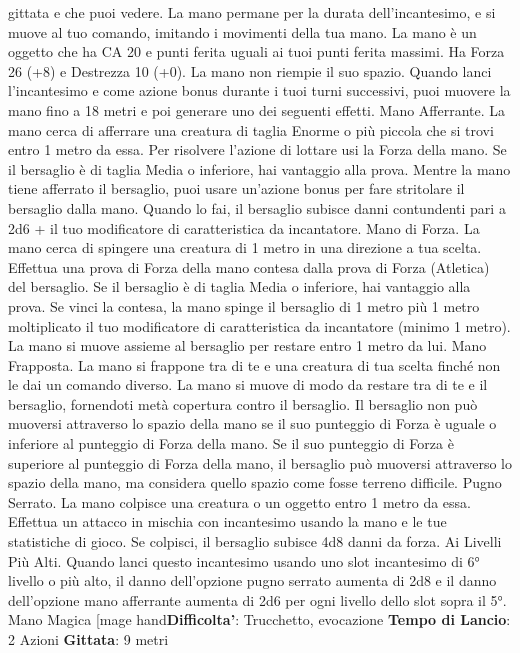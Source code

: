 \begin{multicols}{2}
gittata e che puoi vedere. La mano permane per la
durata dell’incantesimo, e si muove al tuo comando,
imitando i movimenti della tua mano.
La mano è un oggetto che ha CA 20 e punti ferita uguali
ai tuoi punti ferita massimi. Ha Forza 26 (+8) e
Destrezza 10 (+0). La mano non riempie il suo spazio.
Quando lanci l’incantesimo e come azione bonus
durante i tuoi turni successivi, puoi muovere la mano
fino a 18 metri e poi generare uno dei seguenti effetti.
Mano Afferrante. La mano cerca di afferrare una
creatura di taglia Enorme o più piccola che si trovi entro 
1 metro da essa. Per risolvere l’azione di lottare usi la
Forza della mano. Se il bersaglio è di taglia Media o
inferiore, hai vantaggio alla prova. Mentre la mano tiene
afferrato il bersaglio, puoi usare un’azione bonus per
fare stritolare il bersaglio dalla mano. Quando lo fai, il
bersaglio subisce danni contundenti pari a 2d6 + il tuo
modificatore di caratteristica da incantatore.
Mano di Forza. La mano cerca di spingere una
creatura di 1 metro in una direzione a tua scelta.
Effettua una prova di Forza della mano contesa dalla
prova di Forza (Atletica) del bersaglio. Se il bersaglio è
di taglia Media o inferiore, hai vantaggio alla prova. Se
vinci la contesa, la mano spinge il bersaglio di 1 metro
più 1 metro moltiplicato il tuo modificatore di
caratteristica da incantatore (minimo 1 metro). La
mano si muove assieme al bersaglio per restare entro
1 metro da lui.
Mano Frapposta. La mano si frappone tra di te e una
creatura di tua scelta finché non le dai un comando
diverso. La mano si muove di modo da restare tra di te
e il bersaglio, fornendoti metà copertura contro il
bersaglio. Il bersaglio non può muoversi attraverso lo
spazio della mano se il suo punteggio di Forza è uguale
o inferiore al punteggio di Forza della mano. Se il suo
punteggio di Forza è superiore al punteggio di Forza
della mano, il bersaglio può muoversi attraverso lo
spazio della mano, ma considera quello spazio come
fosse terreno difficile.
Pugno Serrato. La mano colpisce una creatura o un
oggetto entro 1 metro da essa. Effettua un attacco in
mischia con incantesimo usando la mano e le tue
statistiche di gioco. Se colpisci, il bersaglio subisce 4d8
danni da forza.
Ai Livelli Più Alti. Quando lanci questo incantesimo
usando uno slot incantesimo di 6° livello o più alto, il
danno dell’opzione pugno serrato aumenta di 2d8 e il
danno dell’opzione mano afferrante aumenta di 2d6 per
ogni livello dello slot sopra il 5°.
Mano Magica
[mage hand\textbf{Difficolta'}:
Trucchetto, evocazione
\textbf{Tempo di Lancio}: 2 Azioni
\textbf{Gittata}: 9 metri

\end{multicols}
